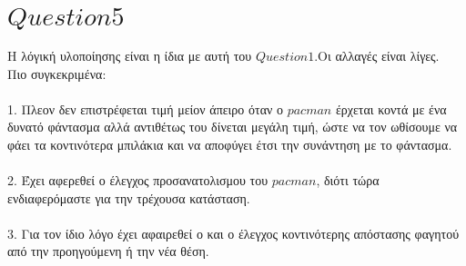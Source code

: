 \documentclass[10pt]{article}
\begin{document}
\section*{$Question 5$}
\hspace{10mm}
Η λόγική υλοποίησης είναι η ίδια με αυτή του $Question1$.Οι αλλαγές είναι λίγες. \\ Πιο συγκεκριμένα: \\ \\
1. Πλεον δεν επιστρέφεται τιμή μείον άπειρο όταν ο $pacman$ έρχεται κοντά με ένα δυνατό φάντασμα αλλά αντιθέτως του δίνεται μεγάλη τιμή, ώστε να τον ωθίσουμε να φάει τα κοντινότερα μπιλάκια και να αποφύγει έτσι την συνάντηση με το φάντασμα. \\ \\ 
2. Έχει αφερεθεί ο έλεγχος προσανατολισμου του $pacman$, διότι τώρα ενδιαφερόμαστε για την τρέχουσα κατάσταση. \\ \\
3. Για τον ίδιο λόγο έχει αφαιρεθεί ο και ο έλεγχος κοντινότερης απόστασης φαγητού από την προηγούμενη ή την νέα θέση.
\end{document}
